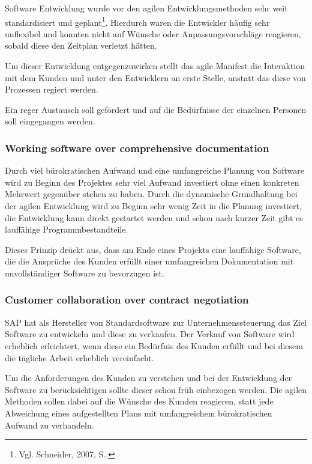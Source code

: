                 Software Entwicklung wurde vor den agilen Entwicklungsmethoden sehr weit standardisiert und geplant\footnote{Vgl. Schneider, 2007, S..}. Hierdurch waren die Entwickler häufig sehr unflexibel und konnten nicht auf Wünsche oder Anpassungsvorschläge reagieren, sobald diese den Zeitplan verletzt hätten.

                Um dieser Entwicklung entgegenzuwirken stellt das agile Manifest die Interaktion mit dem Kunden und unter den Entwicklern an erste Stelle, anstatt das diese von Prozessen regiert werden.

                Ein reger Austausch soll gefördert und auf die Bedürfnisse der einzelnen Personen soll eingegangen werden.

            \subsubsection{Working software over comprehensive documentation}

                Durch viel bürokratischen Aufwand und eine umfangreiche Planung von Software wird zu Beginn des Projektes sehr viel Aufwand investiert ohne einen konkreten Mehrwert gegenüber stehen zu haben. Durch die dynamische Grundhaltung bei der agilen Entwicklung wird zu Beginn sehr wenig Zeit in die Planung investiert, die Entwicklung kann direkt gestartet werden und schon nach kurzer Zeit gibt es lauffähige Programmbestandteile.

                Dieses Prinzip drückt aus, dass am Ende eines Projekts eine lauffähige Software, die die Ansprüche des Kunden erfüllt einer umfangreichen Dokumentation mit unvollständiger Software zu bevorzugen ist.

            \subsubsection{Customer collaboration over contract negotiation}

                SAP hat als Hersteller von Standardsoftware zur Unternehmenssteuerung das Ziel Software zu entwickeln und diese zu verkaufen. Der Verkauf von Software wird erheblich erleichtert, wenn diese ein Bedürfnis des Kunden erfüllt und bei diesem die tägliche Arbeit erheblich vereinfacht.

                Um die Anforderungen des Kunden zu verstehen und bei der Entwicklung der Software zu berücksichtigen sollte dieser schon früh einbezogen werden. Die agilen Methoden sollen dabei auf die Wünsche des Kunden reagieren, statt jede Abweichung eines aufgestellten Plans mit umfangreichem bürokratischen Aufwand zu verhandeln.

